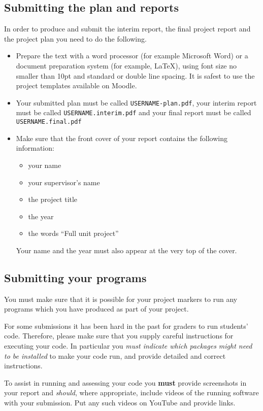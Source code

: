 \documentclass[11pt]{article}
\begin{document}
\subsection{Submitting the plan and reports}
\label{sec:submitReports}
In order to produce and submit the interim report, the final project report and the project plan you need to do the following.
\begin{itemize}
\item Prepare the text with a word processor (for example Microsoft Word\texttrademark) or a document preparation system (for example,  \LaTeX), using font size no smaller than 10pt and standard or double line spacing.  It is safest to use the project templates available on Moodle.

\item Your submitted plan must be called \texttt{USERNAME-plan.pdf}, your interim report must be called \texttt{USERNAME.interim.pdf} and your final report must be called \texttt{USERNAME.final.pdf}

\item Make sure that the front cover of your report contains the following information:
\begin{itemize}
\item your name
\item your supervisor's name
\item the project title
\item the year
\item the words ``Full unit project''
\end{itemize}
Your name and the year must also appear at the very top of the cover.

\end{itemize}

\subsection{Submitting your programs}
\label{sec:submitPrograms}
You must make sure that it is possible for your project markers to run any programs which you have produced as part of your project.

For some submissions it has been hard in the past for graders to run students' code.  Therefore, please make sure that you supply careful instructions for executing your code.  In particular you \textit{must indicate which packages might need to be installed }to make your code run, and provide detailed and correct instructions.

To assist in running and assessing your code you \textbf{must} provide screenshots in your report and \textit{should}, where appropriate, include videos of the running software with your submission.  Put any such videos on YouTube and provide links.%
\end{document}
